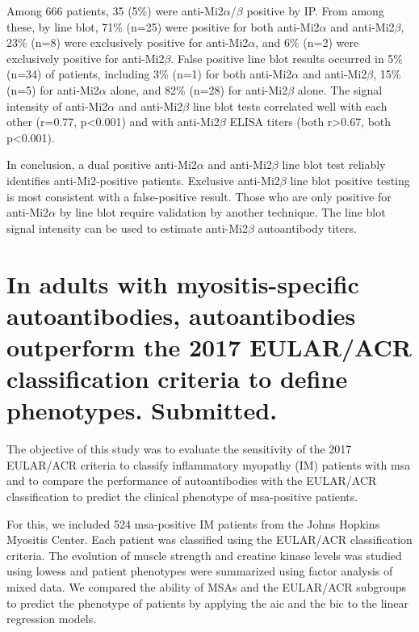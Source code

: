 Among 666 patients, 35 (5\%) were anti-Mi2$\alpha$/$\beta$ positive by IP. From among these, by line blot, 71\% (n=25) were positive for both anti-Mi2$\alpha$ and anti-Mi2$\beta$, 23\% (n=8) were exclusively positive for anti-Mi2$\alpha$, and 6\% (n=2) were exclusively positive for anti-Mi2$\beta$.  False positive line blot results occurred in 5\% (n=34) of patients, including 3\% (n=1) for both anti-Mi2$\alpha$ and anti-Mi2$\beta$, 15\% (n=5) for anti-Mi2$\alpha$ alone, and 82\% (n=28) for anti-Mi2$\beta$ alone.  The signal intensity of anti-Mi2$\alpha$ and anti-Mi2$\beta$ line blot tests correlated well with each other (r=0.77, p<0.001) and with anti-Mi2$\beta$ ELISA titers (both r>0.67, both p<0.001).  

In conclusion, a dual positive anti-Mi2$\alpha$ and anti-Mi2$\beta$ line blot test reliably identifies anti-Mi2-positive patients. Exclusive anti-Mi2$\beta$ line blot positive testing is most consistent with a false-positive result. Those who are only positive for anti-Mi2$\alpha$ by line blot require validation by another technique. The line blot signal intensity can be used to estimate anti-Mi2$\beta$ autoantibody titers.



{\cleardoublepage}

\section{In adults with myositis-specific autoantibodies, autoantibodies outperform the 2017 EULAR/ACR classification criteria to define phenotypes. Submitted.}
\label{sec:atb_class}

The objective of this study was to evaluate the sensitivity of the 2017 EULAR/ACR criteria to classify inflammatory myopathy (IM) patients with \gls{msa} and to compare the performance of autoantibodies with the EULAR/ACR classification to predict the clinical phenotype of \gls{msa}-positive patients.

For this, we included 524 \gls{msa}-positive IM patients from the Johns Hopkins Myositis Center. Each patient was classified using the EULAR/ACR classification criteria. The evolution of muscle strength and creatine kinase levels was studied using \gls{lowess} and patient phenotypes were summarized using factor analysis of mixed data. We compared the ability of MSAs and the EULAR/ACR subgroups to predict the phenotype of patients by applying the \gls{aic} and the \gls{bic} to the linear regression models.

